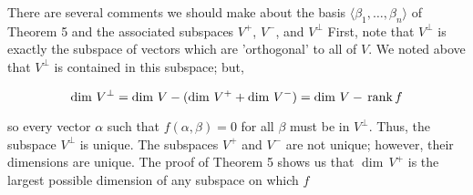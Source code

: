 There are several comments we should make about the basis \(\langle\beta_{1},\ldots,\beta_{n}\rangle\) of Theorem 5 and the associated subspaces \(V^{+}\), \(V^{-}\), and \(V^{\perp}\) First, note that \(V^{\perp}\) is exactly the subspace of vectors which are 'orthogonal' to all of \(V\). We noted above that \(V^{\perp}\) is contained in this subspace; but,

\[\dim\,V^{\perp}=\dim\,V-(\dim\,V^{+}+\dim\,V^{-})=\dim\,V-\,{\rm rank}\,f\]

so every vector \(\alpha\) such that \(f(\alpha,\beta)=0\) for all \(\beta\) must be in \(V^{\perp}\). Thus, the subspace \(V^{\perp}\) is unique. The subspaces \(V^{+}\) and \(V^{-}\) are not unique; however, their dimensions are unique. The proof of Theorem 5 shows us that \(\dim\,V^{+}\) is the largest possible dimension of any subspace on which \(f\) 